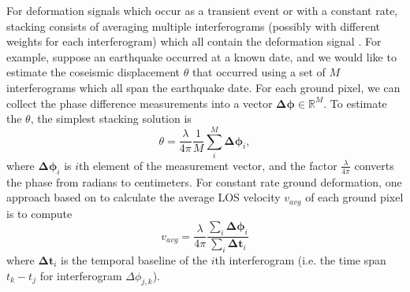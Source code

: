 For deformation signals which occur as a transient event 
or with a constant rate, stacking consists of averaging multiple interferograms (possibly with different weights for each interferogram) which all contain the deformation signal \citep{Simons2007InterferometricSyntheticAperture, Zheng2019ImagingCascadiaSlow}. 
For example, suppose an earthquake occurred at a known date, and we would like to estimate the coseismic displacement $\theta$ that occurred using a set of $M$ interferograms which all span the earthquake date. For each ground pixel, we can collect the phase difference measurements into a vector $\bm{\Delta \phi} \in \mathbb{R}^{M} $.
To estimate the $\theta$, the simplest stacking solution is
\begin{equation}
	\theta = \frac{\lambda }{4 \pi} \frac{1}{M} \sum_i^M \bm{\Delta \phi}_i ,
	\label{eq:ch3-stacking-1}
\end{equation}
where $\bm{\Delta \phi}_i$ is $i$th element of the measurement vector, and the factor $  \frac{\lambda }{4 \pi} $ converts the phase from radians to centimeters.
For constant rate ground deformation, one approach based on \citep{Sandwell1998PhaseGradientApproach} to calculate the average LOS velocity $v_{avg}$ of each ground pixel is to compute
\begin{equation}
	v_{avg} = \frac{\lambda }{4 \pi} \frac{\sum_i \bm{\Delta \phi}_i}{\sum_i \bm{\Delta t}_i }
	\label{eq:ch3-stacking-2}
\end{equation}
where $ \bm{\Delta t}_i $ is the temporal baseline of the $i$th interferogram (i.e. the time span $t_k - t_j$  for interferogram $ \Delta \phi_{j, k} $). %




